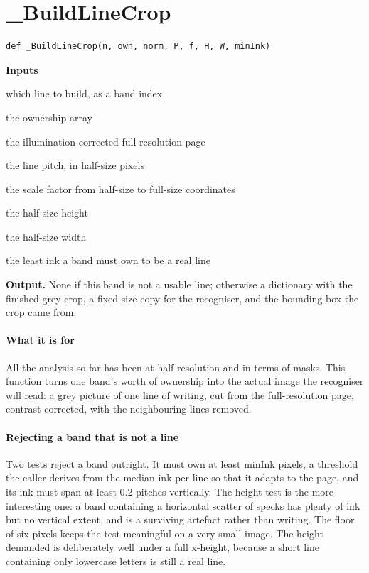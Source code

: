 \section{\_BuildLineCrop}
\begin{lstlisting}[style=sig]
def _BuildLineCrop(n, own, norm, P, f, H, W, minInk)
\end{lstlisting}

\noindent\textbf{Inputs}
\begin{description}[leftmargin=2.2em,style=nextline,font=\normalfont\ttfamily]\setlength\itemsep{1pt}
  \item[{n}] \normalfont which line to build, as a band index
  \item[{own}] \normalfont the ownership array
  \item[{norm}] \normalfont the illumination-corrected full-resolution page
  \item[{P}] \normalfont the line pitch, in half-size pixels
  \item[{f}] \normalfont the scale factor from half-size to full-size coordinates
  \item[{H}] \normalfont the half-size height
  \item[{W}] \normalfont the half-size width
  \item[{minInk}] \normalfont the least ink a band must own to be a real line
\end{description}

\noindent\textbf{Output.} None if this band is not a usable line; otherwise a dictionary with the finished grey crop, a fixed-size copy for the recogniser, and the bounding box the crop came from.


\paragraph{What it is for}
All the analysis so far has been at half resolution and in terms of masks. This function turns one band's worth of ownership into the actual image the recogniser will read: a grey picture of one line of writing, cut from the full-resolution page, contrast-corrected, with the neighbouring lines removed.


\paragraph{Rejecting a band that is not a line}
Two tests reject a band outright. It must own at least minInk pixels, a threshold the caller derives from the median ink per line so that it adapts to the page, and its ink must span at least 0.2 pitches vertically. The height test is the more interesting one: a band containing a horizontal scatter of specks has plenty of ink but no vertical extent, and is a surviving artefact rather than writing. The floor of six pixels keeps the test meaningful on a very small image. The height demanded is deliberately well under a full x-height, because a short line containing only lowercase letters is still a real line.


